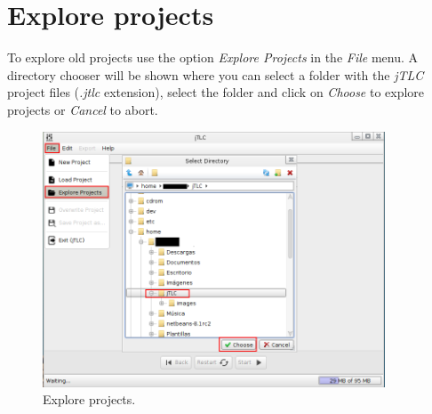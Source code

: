 \section{Explore projects}
To explore old projects use the option \emph{Explore Projects} in the \emph{File} menu. A directory chooser will be shown where you can select a folder with the \textit{jTLC} project files (\emph{.jtlc} extension), select the folder and click on \emph{Choose} to explore projects or \emph{Cancel} to abort.
\begin{figure}[H]
	\vspace{0cm}
	\centering
	\includegraphics[width=385px]{imagenes/explore_projects}
	\centering
	\vspace{-0.4cm}
	\caption{Explore projects.}
	\label{fig:explore_projects}
	\vspace{-0.25cm}
\end{figure}
\newpage

